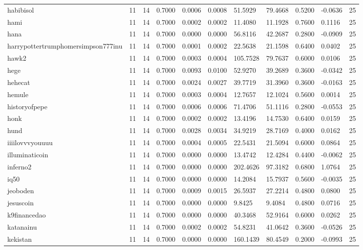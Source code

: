 \begin{table}[htbp]
\begin{tabular}{lllllllllll}
habibisol & 11 & 14 & 0.7000 & 0.0006 & 0.0008 & 51.5929 & 79.4668 & 0.5200 & -0.0636 & 25 \\
hami & 11 & 14 & 0.7000 & 0.0002 & 0.0002 & 11.4080 & 11.1928 & 0.7600 & 0.1116 & 25 \\
hana & 11 & 14 & 0.7000 & 0.0000 & 0.0000 & 56.8116 & 42.2687 & 0.2800 & -0.0909 & 25 \\
harrypottertrumphomersimpson777inu & 11 & 14 & 0.7000 & 0.0001 & 0.0002 & 22.5638 & 21.1598 & 0.6400 & 0.0402 & 25 \\
hawk2 & 11 & 14 & 0.7000 & 0.0003 & 0.0004 & 105.7528 & 79.7637 & 0.6000 & 0.0106 & 25 \\
hege & 11 & 14 & 0.7000 & 0.0093 & 0.0100 & 52.9270 & 39.2689 & 0.3600 & -0.0342 & 25 \\
hehecat & 11 & 14 & 0.7000 & 0.0024 & 0.0027 & 39.7719 & 31.3960 & 0.3600 & -0.0163 & 25 \\
hemule & 11 & 14 & 0.7000 & 0.0003 & 0.0004 & 12.7657 & 12.1024 & 0.5600 & 0.0014 & 25 \\
historyofpepe & 11 & 14 & 0.7000 & 0.0006 & 0.0006 & 71.4706 & 51.1116 & 0.2800 & -0.0553 & 25 \\
honk & 11 & 14 & 0.7000 & 0.0002 & 0.0002 & 13.4196 & 14.7530 & 0.6400 & 0.0159 & 25 \\
hund & 11 & 14 & 0.7000 & 0.0028 & 0.0034 & 34.9219 & 28.7169 & 0.4000 & 0.0162 & 25 \\
iiiilovvvyouuuu & 11 & 14 & 0.7000 & 0.0004 & 0.0005 & 22.5431 & 21.5094 & 0.6000 & 0.0864 & 25 \\
illuminaticoin & 11 & 14 & 0.7000 & 0.0000 & 0.0000 & 13.4742 & 12.4284 & 0.4400 & -0.0062 & 25 \\
inferno2 & 11 & 14 & 0.7000 & 0.0000 & 0.0000 & 202.4626 & 97.3182 & 0.6800 & 1.0764 & 25 \\
iq50 & 11 & 14 & 0.7000 & 0.0000 & 0.0000 & 14.2084 & 15.7937 & 0.5600 & -0.0035 & 25 \\
jeoboden & 11 & 14 & 0.7000 & 0.0009 & 0.0015 & 26.5937 & 27.2214 & 0.4800 & 0.0800 & 25 \\
jesuscoin & 11 & 14 & 0.7000 & 0.0000 & 0.0000 & 9.8425 & 9.4084 & 0.4800 & 0.0716 & 25 \\
k9financedao & 11 & 14 & 0.7000 & 0.0000 & 0.0000 & 40.3468 & 52.9164 & 0.6000 & 0.0262 & 25 \\
katanainu & 11 & 14 & 0.7000 & 0.0002 & 0.0002 & 54.8231 & 41.0642 & 0.3600 & -0.0526 & 25 \\
kekistan & 11 & 14 & 0.7000 & 0.0000 & 0.0000 & 160.1439 & 80.4549 & 0.2000 & -0.0993 & 25 \\

\end{tabular}
\end{table}
